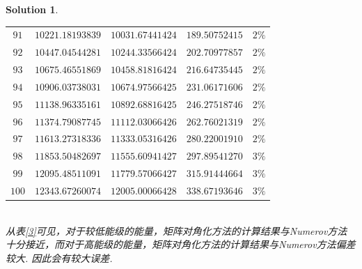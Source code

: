 \documentclass[UTF8,10pt,a4paper]{article}
\theoremstyle{Problem}
\theoremstyle{Solution}
\newtheorem*{sol}{Solution}
\begin{document}
\begin{sol}
\begin{table}[h]
\begin{tabular}{ccccc}
            $91$                      & $10221.18193839$             & $10031.67441424$          & $189.50752415$            & $2\%$       \\
            $92$                      & $10447.04544281$             & $10244.33566424$          & $202.70977857$            & $2\%$       \\
            $93$                      & $10675.46551869$             & $10458.81816424$          & $216.64735445$            & $2\%$       \\
            $94$                      & $10906.03738031$             & $10674.97566425$          & $231.06171606$            & $2\%$       \\
            $95$                      & $11138.96335161$             & $10892.68816425$          & $246.27518746$            & $2\%$       \\
            $96$                      & $11374.79087745$             & $11112.03066426$          & $262.76021319$            & $2\%$       \\
            $97$                      & $11613.27318336$             & $11333.05316426$          & $280.22001910$            & $2\%$       \\
            $98$                      & $11853.50482697$             & $11555.60941427$          & $297.89541270$            & $3\%$       \\
            $99$                      & $12095.48511091$             & $11779.57066427$          & $315.91444664$            & $3\%$       \\
            $100$                     & $12343.67260074$             & $12005.00066428$          & $338.67193646$            & $3\%$       \\ \hline
        \end{tabular}
    \end{table}
    \\从表\ref{3}可见，对于较低能级的能量，矩阵对角化方法的计算结果与Numerov方法十分接近，而对于高能级的能量，矩阵对角化方法的计算结果与Numerov方法偏差较大. 因此会有较大误差.
\end{sol}
\end{document}
